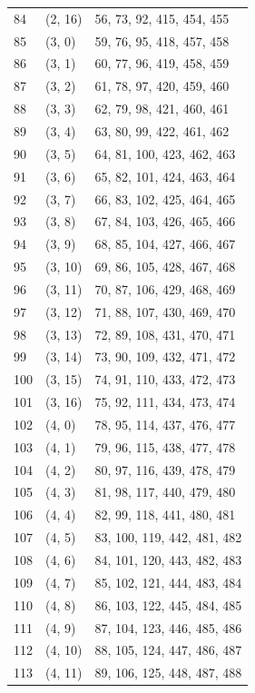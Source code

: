\documentclass{article}
\begin{document}
\begin{longtable}{lll}
  84 & (2, 16) & 56, 73, 92, 415, 454, 455 \\
  85 & (3, 0) & 59, 76, 95, 418, 457, 458 \\
  86 & (3, 1) & 60, 77, 96, 419, 458, 459 \\
  87 & (3, 2) & 61, 78, 97, 420, 459, 460 \\
  88 & (3, 3) & 62, 79, 98, 421, 460, 461 \\
  89 & (3, 4) & 63, 80, 99, 422, 461, 462 \\
  90 & (3, 5) & 64, 81, 100, 423, 462, 463 \\
  91 & (3, 6) & 65, 82, 101, 424, 463, 464 \\
  92 & (3, 7) & 66, 83, 102, 425, 464, 465 \\
  93 & (3, 8) & 67, 84, 103, 426, 465, 466 \\
  94 & (3, 9) & 68, 85, 104, 427, 466, 467 \\
  95 & (3, 10) & 69, 86, 105, 428, 467, 468 \\
  96 & (3, 11) & 70, 87, 106, 429, 468, 469 \\
  97 & (3, 12) & 71, 88, 107, 430, 469, 470 \\
  98 & (3, 13) & 72, 89, 108, 431, 470, 471 \\
  99 & (3, 14) & 73, 90, 109, 432, 471, 472 \\
  100 & (3, 15) & 74, 91, 110, 433, 472, 473 \\
  101 & (3, 16) & 75, 92, 111, 434, 473, 474 \\
  102 & (4, 0) & 78, 95, 114, 437, 476, 477 \\
  103 & (4, 1) & 79, 96, 115, 438, 477, 478 \\
  104 & (4, 2) & 80, 97, 116, 439, 478, 479 \\
  105 & (4, 3) & 81, 98, 117, 440, 479, 480 \\
  106 & (4, 4) & 82, 99, 118, 441, 480, 481 \\
  107 & (4, 5) & 83, 100, 119, 442, 481, 482 \\
  108 & (4, 6) & 84, 101, 120, 443, 482, 483 \\
  109 & (4, 7) & 85, 102, 121, 444, 483, 484 \\
  110 & (4, 8) & 86, 103, 122, 445, 484, 485 \\
  111 & (4, 9) & 87, 104, 123, 446, 485, 486 \\
  112 & (4, 10) & 88, 105, 124, 447, 486, 487 \\
  113 & (4, 11) & 89, 106, 125, 448, 487, 488 \\

\end{longtable}
\end{document}
